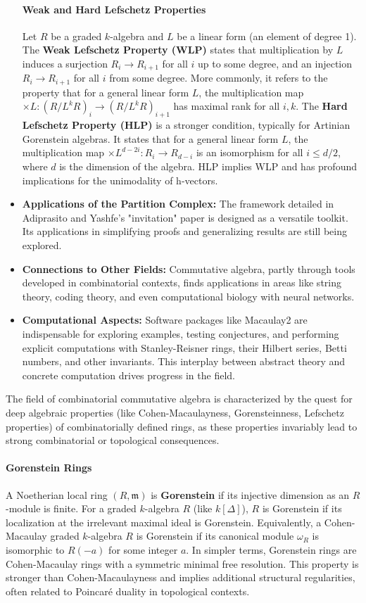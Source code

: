 \documentclass[12pt]{article}
\theoremstyle{definition}
\numberwithin{equation}{subsection}
\begin{document}
\begin{itemize}
\paragraph{Weak and Hard Lefschetz Properties}
Let $R$ be a graded $k$-algebra and $L$ be a linear form (an element of degree 1).
The \textbf{Weak Lefschetz Property (WLP)} states that multiplication by $L$ induces a surjection $R_i \to R_{i+1}$ for all $i$ up to some degree, and an injection $R_i \to R_{i+1}$ for all $i$ from some degree. More commonly, it refers to the property that for a general linear form $L$, the multiplication map $\times L: (R/L^k R)_i \to (R/L^k R)_{i+1}$ has maximal rank for all $i, k$.
The \textbf{Hard Lefschetz Property (HLP)} is a stronger condition, typically for Artinian Gorenstein algebras. It states that for a general linear form $L$, the multiplication map $\times L^{d-2i}: R_i \to R_{d-i}$ is an isomorphism for all $i \le d/2$, where $d$ is the dimension of the algebra. HLP implies WLP and has profound implications for the unimodality of h-vectors.
\item \textbf{Applications of the Partition Complex:} The framework detailed in Adiprasito and Yashfe's "invitation" paper  is designed as a versatile toolkit. Its applications in simplifying proofs and generalizing results are still being explored.
\item \textbf{Connections to Other Fields:} Commutative algebra, partly through tools developed in combinatorial contexts, finds applications in areas like string theory, coding theory, and even computational biology with neural networks.
\item \textbf{Computational Aspects:} Software packages like Macaulay2  are indispensable for exploring examples, testing conjectures, and performing explicit computations with Stanley-Reisner rings, their Hilbert series, Betti numbers, and other invariants. This interplay between abstract theory and concrete computation drives progress in the field.
\end{itemize}
The field of combinatorial commutative algebra is characterized by the quest for deep algebraic properties (like Cohen-Macaulayness, Gorensteinness, Lefschetz properties) of combinatorially defined rings, as these properties invariably lead to strong combinatorial or topological consequences.

\paragraph{Gorenstein Rings}
A Noetherian local ring $(R, \mathfrak{m})$ is \textbf{Gorenstein} if its injective dimension as an $R$-module is finite. For a graded $k$-algebra $R$ (like $k[\Delta]$), $R$ is Gorenstein if its localization at the irrelevant maximal ideal is Gorenstein.
Equivalently, a Cohen-Macaulay graded $k$-algebra $R$ is Gorenstein if its canonical module $\omega_R$ is isomorphic to $R(-a)$ for some integer $a$. In simpler terms, Gorenstein rings are Cohen-Macaulay rings with a symmetric minimal free resolution. This property is stronger than Cohen-Macaulayness and implies additional structural regularities, often related to Poincaré duality in topological contexts.
\end{document}

